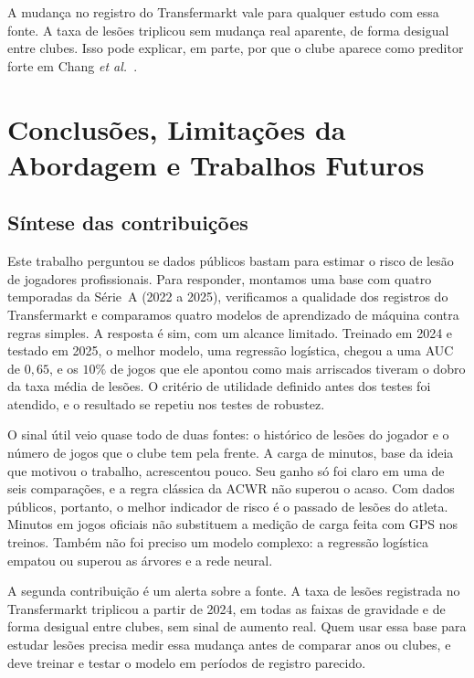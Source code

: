 \documentclass[conference]{IEEEtran}
\begin{document}
A mudança no registro do Transfermarkt vale para qualquer estudo com essa fonte. A taxa de lesões triplicou sem mudança real aparente, de forma desigual entre clubes. Isso pode explicar, em parte, por que o clube aparece como preditor forte em Chang \textit{et al.}~\cite{chang2024}.

\section{Conclusões, Limitações da Abordagem e Trabalhos Futuros}

\subsection{Síntese das contribuições}

Este trabalho perguntou se dados públicos bastam para estimar o risco de lesão de jogadores profissionais. Para responder, montamos uma base com quatro temporadas da Série~A (2022 a 2025), verificamos a qualidade dos registros do Transfermarkt e comparamos quatro modelos de aprendizado de máquina contra regras simples. A resposta é sim, com um alcance limitado. Treinado em 2024 e testado em 2025, o melhor modelo, uma regressão logística, chegou a uma AUC de $0{,}65$, e os $10\%$ de jogos que ele apontou como mais arriscados tiveram o dobro da taxa média de lesões. O critério de utilidade definido antes dos testes foi atendido, e o resultado se repetiu nos testes de robustez.

O sinal útil veio quase todo de duas fontes: o histórico de lesões do jogador e o número de jogos que o clube tem pela frente. A carga de minutos, base da ideia que motivou o trabalho, acrescentou pouco. Seu ganho só foi claro em uma de seis comparações, e a regra clássica da ACWR não superou o acaso. Com dados públicos, portanto, o melhor indicador de risco é o passado de lesões do atleta. Minutos em jogos oficiais não substituem a medição de carga feita com GPS nos treinos. Também não foi preciso um modelo complexo: a regressão logística empatou ou superou as árvores e a rede neural.

A segunda contribuição é um alerta sobre a fonte. A taxa de lesões registrada no Transfermarkt triplicou a partir de 2024, em todas as faixas de gravidade e de forma desigual entre clubes, sem sinal de aumento real. Quem usar essa base para estudar lesões precisa medir essa mudança antes de comparar anos ou clubes, e deve treinar e testar o modelo em períodos de registro parecido.
\end{document}
